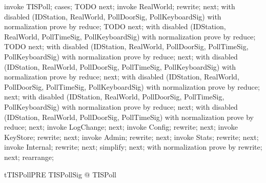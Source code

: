 \begin{}[lTISPollPREStdUpdLemma]
invoke TISPoll;
cases;
TODO
next;
invoke \Xi RealWorld;
rewrite;
next;
with disabled (IDStation, RealWorld, PollDoorSig, PollKeyboardSig)
  with normalization prove by reduce;
TODO
next;
with disabled (IDStation, RealWorld, PollTimeSig, PollKeyboardSig)
  with normalization prove by reduce;
TODO
next;
with disabled (IDStation, RealWorld, PollDoorSig, PollTimeSig, PollKeyboardSig)
  with normalization prove by reduce;
next;
with disabled (IDStation, RealWorld, PollDoorSig, PollTimeSig, PollKeyboardSig)
  with normalization prove by reduce;
next;
with disabled (IDStation, RealWorld, PollDoorSig, PollTimeSig, PollKeyboardSig)
  with normalization prove by reduce;
next;
with disabled (IDStation, RealWorld, PollDoorSig, PollTimeSig, PollKeyboardSig)
  with normalization prove by reduce;
next;
with disabled (IDStation, RealWorld, PollDoorSig, PollTimeSig)
  with normalization prove by reduce;
next;
invoke LogChange;
next;
invoke \Xi Config;
rewrite;
next;
invoke \Xi KeyStore;
rewrite;
next;
invoke \Xi Admin;
rewrite;
next;
invoke \Xi Stats;
rewrite;
next;
invoke \Xi Internal;
rewrite;
next;
simplify;
next;
with normalization prove by rewrite;
next;
rearrange;
\end{}

\begin{theorem}{tTISPollPRE}
   \forall TISPollSig @ \pre TISPoll
\end{theorem}

